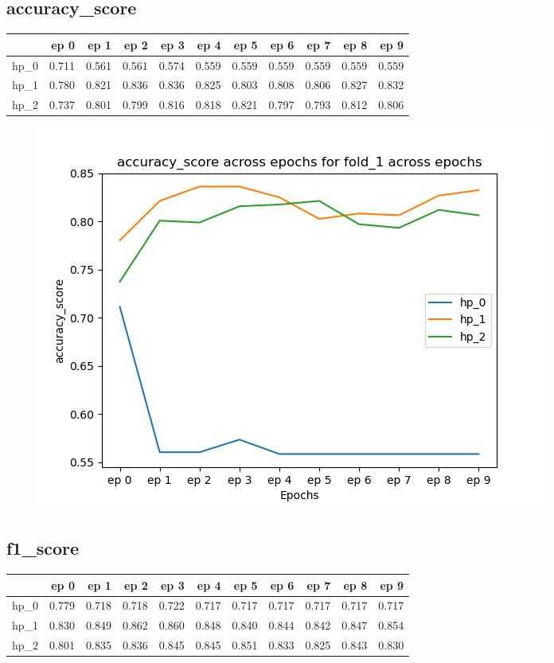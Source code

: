 \documentclass{article}
\begin{document}
\subsection{accuracy\_score}
\begin{tabular}{lrrrrrrrrrr}
\toprule
{} &   ep 0 &   ep 1 &   ep 2 &   ep 3 &   ep 4 &   ep 5 &   ep 6 &   ep 7 &   ep 8 &   ep 9 \\
\midrule
hp\_0 &  0.711 &  0.561 &  0.561 &  0.574 &  0.559 &  0.559 &  0.559 &  0.559 &  0.559 &  0.559 \\
hp\_1 &  0.780 &  0.821 &  0.836 &  0.836 &  0.825 &  0.803 &  0.808 &  0.806 &  0.827 &  0.832 \\
hp\_2 &  0.737 &  0.801 &  0.799 &  0.816 &  0.818 &  0.821 &  0.797 &  0.793 &  0.812 &  0.806 \\
\bottomrule
\end{tabular}

\begin{figure}[H]
\includegraphics[scale = 0.75]{fold_1/accuracy_score}
\end{figure}
\subsection{f1\_score}
\begin{tabular}{lrrrrrrrrrr}
\toprule
{} &   ep 0 &   ep 1 &   ep 2 &   ep 3 &   ep 4 &   ep 5 &   ep 6 &   ep 7 &   ep 8 &   ep 9 \\
\midrule
hp\_0 &  0.779 &  0.718 &  0.718 &  0.722 &  0.717 &  0.717 &  0.717 &  0.717 &  0.717 &  0.717 \\
hp\_1 &  0.830 &  0.849 &  0.862 &  0.860 &  0.848 &  0.840 &  0.844 &  0.842 &  0.847 &  0.854 \\
hp\_2 &  0.801 &  0.835 &  0.836 &  0.845 &  0.845 &  0.851 &  0.833 &  0.825 &  0.843 &  0.830 \\
\bottomrule
\end{tabular}
\end{document}
